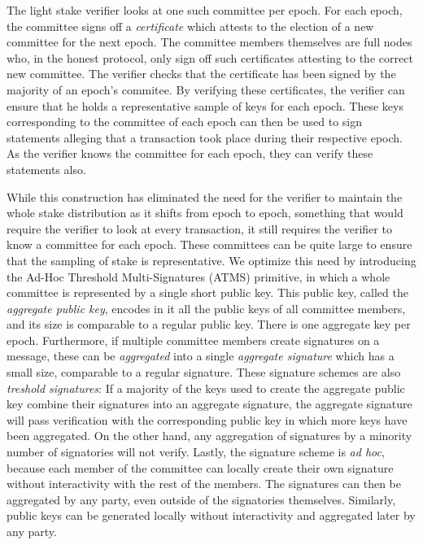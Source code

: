 The light stake verifier looks at one such committee per epoch. For each epoch,
the committee signs off a \emph{certificate} which attests to the election of a
new committee for the next epoch. The committee members themselves are full
nodes who, in the honest protocol, only sign off such certificates attesting to
the correct new committee. The verifier checks that the certificate has been
signed by the majority of an epoch's commitee. By verifying these certificates,
the verifier can ensure that he holds a representative sample of keys for each
epoch. These keys corresponding to the committee of each epoch can then be used
to sign statements alleging that a transaction took place during their
respective epoch. As the verifier knows the committee for each epoch, they can
verify these statements also.

While this construction has eliminated the need for the verifier to maintain the
whole stake distribution as it shifts from epoch to epoch, something that would
require the verifier to look at every transaction, it still requires the
verifier to know a committee for each epoch. These committees can be quite
large to ensure that the sampling of stake is representative. We optimize this
need by introducing the Ad-Hoc Threshold Multi-Signatures (ATMS) primitive, in
which a whole committee is represented by a single short public key. This public
key, called the \emph{aggregate public key}, encodes in it all the public keys
of all committee members, and its size is comparable to a regular public key.
There is one aggregate key per epoch. Furthermore, if multiple committee members
create signatures on a message, these can be \emph{aggregated} into a single
\emph{aggregate signature} which has a small size, comparable to a regular
signature. These signature schemes are also \emph{treshold signatures}:
If a majority of the keys used to create the aggregate public key combine their
signatures into an aggregate signature, the aggregate signature will pass
verification with the corresponding public key in which more keys have been
aggregated. On the other hand, any aggregation of signatures by a minority
number of signatories will not verify. Lastly, the signature scheme is
\emph{ad hoc}, because each member of the committee can locally create their own
signature without interactivity with the rest of the members. The signatures can
then be aggregated by any party, even outside of the signatories themselves.
Similarly, public keys can be generated locally without interactivity and
aggregated later by any party.


